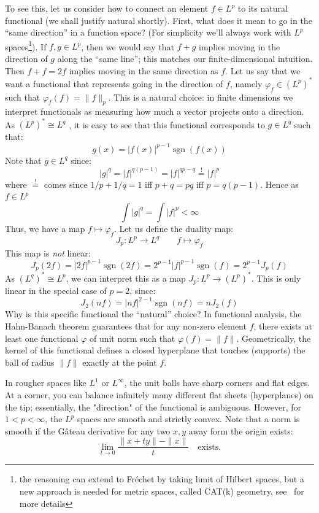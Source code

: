 \documentclass{article}
\newcommand{\sgn}{{\operatorname{sgn}}}
\let\temp\phi
\let\phi\varphi
\let\varphi\temp
\begin{document}
To see this, let us consider how to connect an element $f \in L^p$ to its natural functional (we shall justify
natural shortly). First, what does it mean to go in the ``same direction'' in a function space? (For
simplicity we'll always work with $L^p$ spaces\footnote{the reasoning can extend to Fr\'echet by taking limit
  of Hilbert spaces, but a new approach is needed for metric spaces, called CAT(k) geometry,
see~\cite{millerGEOMETRYMEASURECATk} for more details}). If $f,g \in L^p$, then we would say that $f+g$
implies moving in the direction of $g$ along the ``same line''; this matches our finite-dimensional intuition.
Then $f+f = 2f$ implies moving in the same direction as $f$. Let us say that we want a functional that
represents going in the direction of $f$, namely $\phi_f \in (L^p)^*$ such that $\phi_f(f) = \|f\|_p$. This is
a natural choice: in finite dimensions we interpret functionals as measuring how much a vector projects onto a
direction. As $(L^p)^* \cong L^q$ , it is easy to see that this functional corresponds to $g \in L^q$ such
that:
\[
	g(x) = |f(x)|^{p-1}\sgn(f(x))
\]
Note that $g \in L^q$ since:
\[
	|g|^q = |f|^{q(p-1)} = |f|^{qp - q} \overset{!}{=}|f|^p
\]
where $\overset{!}{=}$ comes since $1/p + 1/q = 1$ iff $p+q = pq$ iff $p = q(p-1)$. Hence as $f \in L^p$
\[
	\int |g|^q = \int |f|^p < \infty
\]
Thus, we have a map $f \mapsto \phi_f$. Let us define the duality map:
\[
	J_p: L^p \to L^q \qquad f \mapsto \phi_f
\]
This map is \emph{not} linear:
\[
	J_p(2f) = |2f|^{p-1}\sgn(2f) = 2^{p-1}|f|^{p-1}\sgn(f) = 2^{p-1}J_p(f)
\]
As $(L^q)^* \cong L^p$, we can interpret this as a map $J_p: L^p \to (L^p)^*$.
This is only linear in the special case of $p =2$, since:
\[
	J_2(nf) = |nf|^{2-1}\sgn(nf) = n J_2(f)
\]
Why is this specific functional the ``natural'' choice? In functional analysis, the Hahn-Banach theorem
guarantees that for any non-zero element $f$, there exists at least one functional $\phi$ of unit norm such
that $\phi(f) = \|f\|$. Geometrically, the kernel of this functional defines a closed hyperplane that touches
(supports) the ball of radius $\|f\|$ exactly at the point $f$.


In rougher spaces like $L^1$ or $L^\infty$, the unit balls have sharp corners and flat edges. At a corner, you
can balance infinitely many different flat sheets (hyperplanes) on the tip; essentially, the "direction" of
the functional is ambiguous. However, for $1 < p < \infty$, the $L^p$ spaces are smooth and strictly convex.
Note that a norm is smooth if the G\^ateau derivative for any two $x,y$ away form the origin exists:
\[
\lim_{t \to 0} \frac{\|x + ty\| - \|x\|}{t} \quad \text{exists.}
\]
\end{document}
